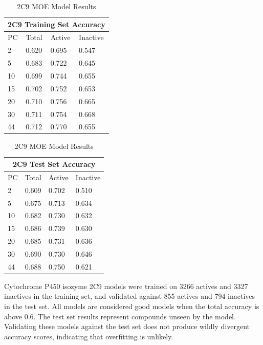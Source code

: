 \begin{table}[H]
\caption{2C9 MOE Model Results}
\begin{minipage}{.5\linewidth}
\centering
\begin{tabular}{|l|l|l|l|}
\hline
\multicolumn{4}{|c|}{2C9 Training Set Accuracy} \\ \hline
PC & Total          & Active          & Inactive\\ \hline
2  & 0.620          & 0.695           & 0.547   \\ \hline
5  & 0.683          & 0.722           & 0.645   \\ \hline
10 & 0.699          & 0.744           & 0.655   \\ \hline
15 & 0.702          & 0.752           & 0.653   \\ \hline
20 & 0.710          & 0.756           & 0.665   \\ \hline
30 & 0.711          & 0.754           & 0.668   \\ \hline
44 & 0.712          & 0.770           & 0.655   \\ \hline
\end{tabular}
\end{minipage}
\begin{minipage}{.5\linewidth}
\centering
\begin{tabular}{|l|l|l|l|}
\hline
\multicolumn{4}{|c|}{2C9 Test Set Accuracy}     \\ \hline
PC & Total          & Active          & Inactive\\ \hline
2  & 0.609          & 0.702           & 0.510   \\ \hline
5  & 0.675          & 0.713           & 0.634   \\ \hline
10 & 0.682          & 0.730           & 0.632   \\ \hline
15 & 0.686          & 0.739           & 0.630   \\ \hline
20 & 0.685          & 0.731           & 0.636   \\ \hline
30 & 0.690          & 0.730           & 0.646   \\ \hline
44 & 0.688          & 0.750           & 0.621   \\ \hline
\end{tabular}
\end{minipage}
\end{table}

Cytochrome P450 isozyme 2C9 models were trained on 3266 actives and 3327 inactives in the training set, and validated against 855 actives and 794 inactives in the test set. All models are considered good models when the total accuracy is above 0.6. The test set results represent compounds unseen by the model. Validating these models against the test set does not produce wildly divergent accuracy scores, indicating that overfitting is unlikely.

